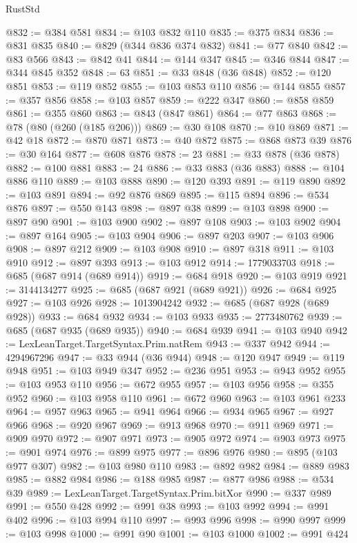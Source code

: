 \begin{lexlean}{RustStd}
\begin{coremodule}
@832 := @384 @581
@834 := @103 @832 @110
@835 := @375 @834
@836 := @831 @835
@840 := @829 (@344 @836 @374 @832)
@841 := @77 @840
@842 := @83 @566
@843 := @842 @41
@844 := @144 @347
@845 := @346 @844
@847 := @344 @845 @352
@848 := 63
@851 := @33 @848 (@36 @848)
@852 := @120 @851
@853 := @119 @852
@855 := @103 @853 @110
@856 := @144 @855
@857 := @357 @856
@858 := @103 @857
@859 := @222 @347
@860 := @858 @859
@861 := @355 @860
@863 := @843 (@847 @861)
@864 := @77 @863
@868 := @78 (@80 (@260 (@185 @206)))
@869 := @30 @108
@870 := @10 @869
@871 := @42 @18
@872 := @870 @871
@873 := @40 @872
@875 := @868 @873 @39
@876 := @30 @164
@877 := @608 @876
@878 := 23
@881 := @33 @878 (@36 @878)
@882 := @100 @881
@883 := 24
@886 := @33 @883 (@36 @883)
@888 := @104 @886 @110
@889 := @103 @888
@890 := @120 @393
@891 := @119 @890
@892 := @103 @891
@894 := @92 @876 @869
@895 := @115 @894
@896 := @534 @876
@897 := @550 @143
@898 := @897 @38
@899 := @103 @898
@900 := @897 @90
@901 := @103 @900
@902 := @897 @108
@903 := @103 @902
@904 := @897 @164
@905 := @103 @904
@906 := @897 @203
@907 := @103 @906
@908 := @897 @212
@909 := @103 @908
@910 := @897 @318
@911 := @103 @910
@912 := @897 @393
@913 := @103 @912
@914 := 1779033703
@918 := @685 (@687 @914 (@689 @914))
@919 := @684 @918
@920 := @103 @919
@921 := 3144134277
@925 := @685 (@687 @921 (@689 @921))
@926 := @684 @925
@927 := @103 @926
@928 := 1013904242
@932 := @685 (@687 @928 (@689 @928))
@933 := @684 @932
@934 := @103 @933
@935 := 2773480762
@939 := @685 (@687 @935 (@689 @935))
@940 := @684 @939
@941 := @103 @940
@942 := LexLeanTarget.TargetSyntax.Prim.natRem
@943 := @337 @942
@944 := 4294967296
@947 := @33 @944 (@36 @944)
@948 := @120 @947
@949 := @119 @948
@951 := @103 @949 @347
@952 := @236 @951
@953 := @943 @952
@955 := @103 @953 @110
@956 := @672 @955
@957 := @103 @956
@958 := @355 @952
@960 := @103 @958 @110
@961 := @672 @960
@963 := @103 @961 @233
@964 := @957 @963
@965 := @941 @964
@966 := @934 @965
@967 := @927 @966
@968 := @920 @967
@969 := @913 @968
@970 := @911 @969
@971 := @909 @970
@972 := @907 @971
@973 := @905 @972
@974 := @903 @973
@975 := @901 @974
@976 := @899 @975
@977 := @896 @976
@980 := @895 (@103 @977 @307)
@982 := @103 @980 @110
@983 := @892 @982
@984 := @889 @983
@985 := @882 @984
@986 := @188 @985
@987 := @877 @986
@988 := @534 @39
@989 := LexLeanTarget.TargetSyntax.Prim.bitXor
@990 := @337 @989
@991 := @550 @428
@992 := @991 @38
@993 := @103 @992
@994 := @991 @402
@996 := @103 @994 @110
@997 := @993 @996
@998 := @990 @997
@999 := @103 @998
@1000 := @991 @90
@1001 := @103 @1000
@1002 := @991 @424

\end{coremodule}
\end{lexlean}
